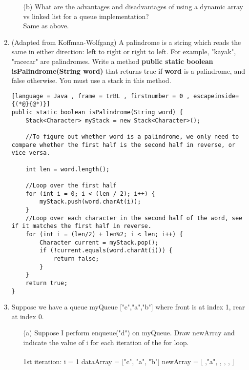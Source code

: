 \documentclass[letter]{article}
\begin{document}
\begin{enumerate}[1.]
\begin{itemize}
        \item [(b)] What are the advantages and disadvantages of using a dynamic array vs linked list for a queue implementation?\\

        Same as above.
        
    \end{itemize}

    \newpage
    \item (Adapted from Koffman-Wolfgang) A palindrome is a string which reads the same in either direction: left to right or right to left. For example, "kayak", "racecar" are palindromes. Write a method \textbf{public static boolean isPalindrome(String word)} that returns true if \textbf{word} is a palindrome, and false otherwise. You must use a stack in this method. 

    \begin{lstlisting}[language = Java , frame = trBL , firstnumber = 0 , escapeinside={(*@}{@*)}]
public static boolean isPalindrome(String word) {
    Stack<Character> myStack = new Stack<Character>();
    
    //To figure out whether word is a palindrome, we only need to compare whether the first half is the second half in reverse, or vice versa. 
    
    int len = word.length();
    
    //Loop over the first half
    for (int i = 0; i < (len / 2); i++) { 
        myStack.push(word.charAt(i));
    }
    //Loop over each character in the second half of the word, see if it matches the first half in reverse.
    for (int i = (len/2) + len%2; i < len; i++) {
        Character current = myStack.pop();
        if (!current.equals(word.charAt(i))) {
            return false; 
        }
    }
    return true;
}
    \end{lstlisting}

    
    \item Suppose we have a queue myQueue ["c","a","b"] where front is at index 1, rear at index 0. 
    \begin{itemize}
        \item [(a)] Suppose I perform enqueue("d") on myQueue. Draw newArray and indicate the value of i for each iteration of the for loop. \\\\

        1st iteration: i = 1
        dataArray = ["c", "a", "b"]
        newArray = [  ,"a",  ,  ,  ,  ]


\end{itemize}
\end{enumerate}
\end{document}
